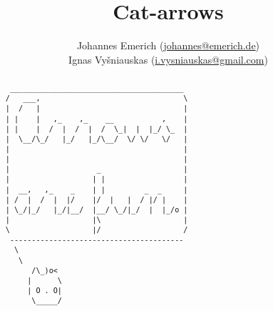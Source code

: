 \documentclass[12pt,a4paper,titlepage]{scrreprt}
\title{Cat-arrows}
\author{%
    Johannes Emerich
        (\href{mailto:Johannes@emerich.de}{johannes@emerich.de})\\
    Ignas Vyšniauskas
        (\href{mailto:i.vysniauskas@gmail.com}{i.vysniauskas@gmail.com})
}
\date{}
\begin{document}
\maketitle

\begin{abstract}
    \begin{verbatim}
 ________________________________________
/   ___,                                 \
|  /   |                                 |
| |    |   ,_    ,_    __           ,    |
| |    |  /  |  /  |  /  \_|  |  |_/ \_  |
|  \__/\_/   |_/   |_/\__/  \/ \/   \/   |
|                                        |
|                                        |
|                    _                   |
|                   | |                  |
|  __,   ,_    _    | |         _  _     |
| /  |  /  |  |/    |/  |   |  / |/ |    |
| \_/|_/   |_/|__/  |__/ \_/|_/  |  |_/o |
|                   |\                   |
\                   |/                   /
 ----------------------------------------
  \
   \
      /\_)o<
     |      \
     | O . O|
      \_____/
    \end{verbatim}
\end{abstract}



\printbibliography
\end{document}
